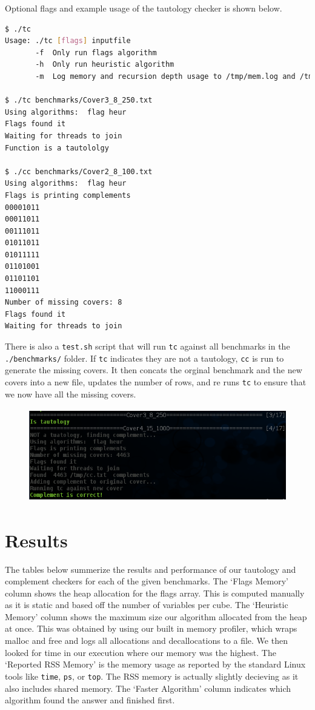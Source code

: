 \documentclass[10pt]{article}
\begin{document}
Optional flags and example usage of the tautology checker is shown below.
\begin{lstlisting}[language=bash]
$ ./tc
Usage: ./tc [flags] inputfile
       -f  Only run flags algorithm
       -h  Only run heuristic algorithm
       -m  Log memory and recursion depth usage to /tmp/mem.log and /tmp/dep.log

$ ./tc benchmarks/Cover3_8_250.txt
Using algorithms:  flag heur
Flags found it
Waiting for threads to join
Function is a tautololgy

$ ./cc benchmarks/Cover2_8_100.txt
Using algorithms:  flag heur
Flags is printing complements
00001011
00011011
00111011
01011011
01011111
01101001
01101101
11000111
Number of missing covers: 8
Flags found it
Waiting for threads to join

\end{lstlisting}

There is also a \texttt{test.sh} script that will run \texttt{tc} against all
benchmarks in the \texttt{./benchmarks/} folder. If \texttt{tc} indicates they
are not a tautology, \texttt{cc} is run to generate the missing covers. It then
concats the orginal benchmark and the new covers into a new file, updates the
number of rows, and re runs \texttt{tc} to ensure that we now have all the
missing covers.

\begin{figure}[H]
    \centering
    \includegraphics[height=1.6in]{./test.png}
\end{figure}

\newpage
\section{Results}

    The tables below summerize the results and performance of our tautology and
    complement checkers for each of the given benchmarks. The `Flags Memory'
    column shows the heap allocation for the flags array. This is computed
    manually as it is static and based off the number of variables per cube.
    The `Heuristic Memory' column shows the maximum size our algorithm
    allocated from the heap at once.  This was obtained by using our built in
    memory profiler, which wraps malloc and free and logs all allocations and
    decallocations to a file. We then looked for time in our execution where our
    memory was the highest. The `Reported RSS Memory' is the memory usage as
    reported by the standard Linux tools like \texttt{time}, \texttt{ps}, or
    \texttt{top}. The RSS memory is actually slightly decieving as it also
    includes shared memory. The `Faster Algorithm' column indicates which
    algorithm found the answer and finished first.
\end{document}
